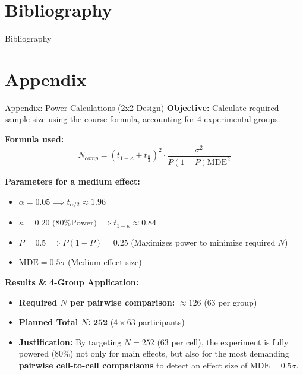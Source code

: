 \documentclass{beamer}
\begin{document}
\section*{Bibliography}
\begin{frame}[allowframebreaks]{Bibliography}
    \printbibliography
\end{frame}
    
\appendix
\section*{Appendix}

\begin{frame}{Appendix: Power Calculations (2x2 Design)}
    \textbf{Objective:} Calculate required sample size using the course formula, accounting for 4 experimental groups.
    
    \vspace{0.2cm}
    \textbf{Formula used:}
    $$ N_{comp} = (t_{1-\kappa} + t_{\frac{\alpha}{2}})^2 \cdot \frac{\sigma^2}{P(1-P)\text{MDE}^2} $$

    \vspace{0.2cm}

    \footnotesize
    \textbf{Parameters for a medium effect:}
    \begin{itemize}
        \item $\alpha = 0.05 \implies t_{\alpha/2} \approx 1.96$
        \item $\kappa = 0.20 \text{ (80\% Power)} \implies t_{1-\kappa} \approx 0.84$
        \item $P = 0.5 \implies P(1-P) = 0.25$ (Maximizes power to minimize required $N$)
        \item $\text{MDE} = 0.5\sigma$ (Medium effect size)
    \end{itemize}

    \vspace{0.2cm}
    \textbf{Results \& 4-Group Application:}
    \begin{itemize}
        \item \textbf{Required $N$ per pairwise comparison:} $\approx 126$ ($63$ per group)
        \item \textbf{Planned Total $N$:} $\mathbf{252}$ ($4 \times 63$ participants)
        \item \textbf{Justification:} By targeting $N=252$ ($63$ per cell), the experiment is fully powered (80\%) not only for main effects, but also for the most demanding \textbf{pairwise cell-to-cell comparisons} to detect an effect size of $\text{MDE} = 0.5\sigma$.
    \end{itemize}
\end{frame}
\end{document}
